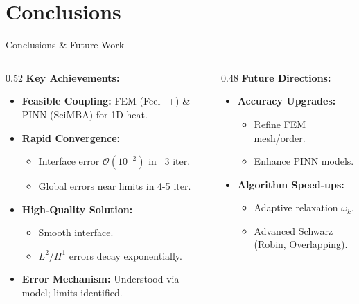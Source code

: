\documentclass{beamer}
\begin{document}
\section{Conclusions}
\begin{frame}{Conclusions \& Future Work}
  \begin{columns}[T]
  \begin{column}{0.52\textwidth} 
    \textbf{Key Achievements:}
    \begin{itemize}
        \item \textbf{Feasible Coupling:} FEM (Feel++) \& PINN (SciMBA) for 1D heat.
        \item \textbf{Rapid Convergence:}
            \begin{itemize}
                \item Interface error \(\mathcal{O}(10^{-2})\) in ~3 iter.
                \item Global errors near limits in 4-5 iter.
            \end{itemize}
        \item \textbf{High-Quality Solution:}
            \begin{itemize}
                \item Smooth interface.
                \item $L^2/H^1$ errors decay exponentially.
            \end{itemize}
        \item \textbf{Error Mechanism:} Understood via model; limits identified.
    \end{itemize}
  \end{column}
  \begin{column}{0.48\textwidth}
    \textbf{Future Directions:}
    \begin{itemize}
        \item \textbf{Accuracy Upgrades:}
            \begin{itemize}
                \item Refine FEM mesh/order.
                \item Enhance PINN models.
            \end{itemize}
        \item \textbf{Algorithm Speed-ups:}
            \begin{itemize}
                \item Adaptive relaxation \(\omega_k\).
                \item Advanced Schwarz (Robin, Overlapping).

\end{itemize}
\end{itemize}
\end{column}
\end{columns}
\end{frame}
\end{document}
